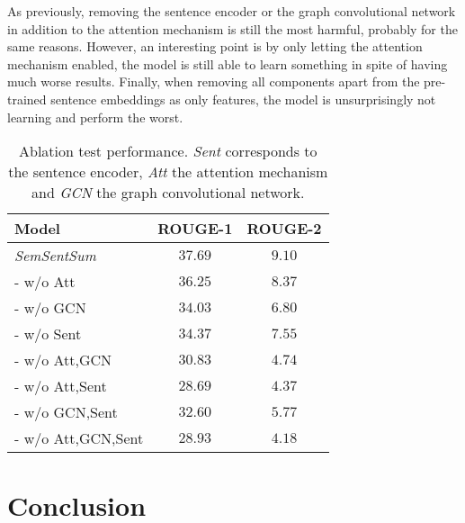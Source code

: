\documentclass{article}
\begin{document}
As previously, removing the sentence encoder or the graph convolutional network in addition to the attention mechanism is still the most harmful, probably for the same reasons. However, an interesting point is by only letting the attention mechanism enabled, the model is still able to learn something in spite of having much worse results. Finally, when removing all components apart from the pre-trained sentence embeddings as only features, the model is unsurprisingly not learning and perform the worst.
 
\begin{table}
  \caption{Ablation test performance. \textit{Sent} corresponds to the sentence encoder, \textit{Att} the attention mechanism and \textit{GCN} the graph convolutional network.}%
  \label{abl_study}
  \centering
  \begin{tabular}{lcc}
    \toprule
    Model & ROUGE-1 & ROUGE-2  \\
    \hline
    \textit{SemSentSum} & $37.69$ & $9.10$\\
    - w/o Att & $36.25$ & $8.37$\\
    - w/o GCN & $34.03$ & $6.80$\\
    - w/o Sent & $34.37$ & $7.55$\\
    \hline
    - w/o Att,GCN & $30.83$ & $4.74$\\
    - w/o Att,Sent & $28.69$ & $4.37$\\
    - w/o GCN,Sent & $32.60$ & $5.77$\\
    \hline
    - w/o Att,GCN,Sent & $28.93$ & $4.18$\\
    \bottomrule
  \end{tabular}
\end{table}

\section{Conclusion}
\label{sec:conclusion}


\end{document}
